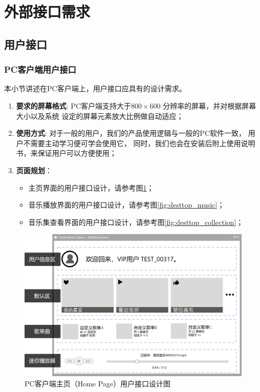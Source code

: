 \section{外部接口需求}
\subsection{用户接口}
\label{ssec:ui}

\subsubsection{PC客户端用户接口} %
本小节讲述在PC客户端上，用户接口应具有的设计需求。

\begin{enumerate}
	\item \textbf{要求的屏幕格式}:
		PC客户端支持大于$800 \times 600$ 分辨率的屏幕，并对根据屏幕大小以及系统
		设定的屏幕元素放大比例做自动适应；
	\item \textbf{使用方式}:
		对于一般的用户，我们的产品使用逻辑与一般的PC软件一致，
			用户不需要主动学习便可学会使用它，
		同时，我们也会在安装后附上使用说明书，来保证用户可以方便使用；
	\item \textbf{页面规划}： 
	\begin{itemize}
		\item 主页界面的用户接口设计，请参考图\ref{fig:desttop_home}；
		\item 音乐播放界面的用户接口设计，请参考图\ref{fig:desttop_music}；
		\item 音乐集查看界面的用户接口设计，请参考图\ref{fig:desttop_collection}；
	\end{itemize}
\end{enumerate}

\begin{figure}[h!]
  \centering

  \includegraphics[width=.95\linewidth]{figures/desttop_home}

  \caption{  \label{fig:desttop_home}
  		PC客户端主页（Home Page）用户接口设计图
    }
\end{figure}


